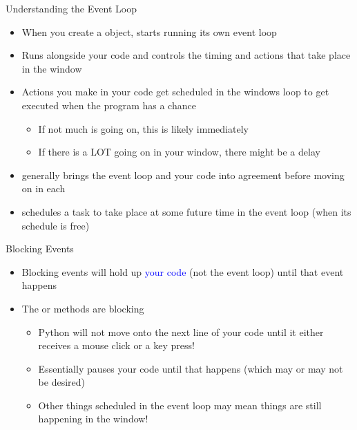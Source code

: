 \documentclass[pdf, aspectratio=169, 12pt]{beamer}
\begin{document}
\begin{frame}{Understanding the Event Loop}
	\begin{itemize}
		\item When you create a  object,  starts running its own \alert{event loop}
		\item Runs alongside your code and controls the timing and actions that take place in the window
		\item Actions you make in your code get scheduled in the windows loop to get executed when the program has a chance
			\begin{itemize}
				\item If not much is going on, this is likely immediately
				\item If there is a LOT going on in your window, there might be a delay
			\end{itemize}
		\item {} generally brings the event loop and your code into agreement before moving on in each
		\item {} schedules a task to take place at some future time in the event loop (when its schedule is free)
	\end{itemize}
\end{frame}

\begin{frame}{Blocking Events}
	\begin{itemize}
		\item \alert{Blocking events} will hold up \textcolor{Blue}{your code} (not the event loop) until that event happens
		\item The  or  methods are blocking
			\begin{itemize}
				\item Python will not move onto the next line of your code until it either receives a mouse click or a key press!
				\item Essentially pauses your code until that happens (which may or may not be desired)
				\item Other things scheduled in the event loop may mean things are still happening in the window!
			\end{itemize}
	\end{itemize}
\end{frame}
\end{document}
